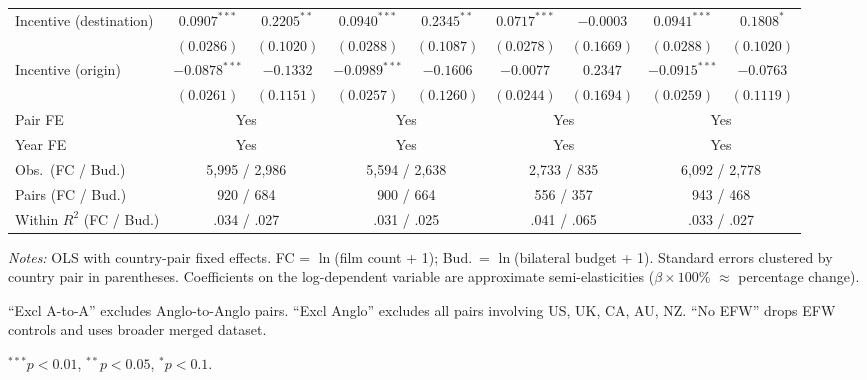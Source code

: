 \begin{table}[htbp]
\begin{tabular}{l cc cc cc cc }
Incentive (destination) & $0.0907^{***}$ & $0.2205^{**}$ & $0.0940^{***}$ & $0.2345^{**}$ & $0.0717^{***}$ & $-0.0003$ & $0.0941^{***}$ & $0.1808^{*}$ \\
 & $(0.0286)$ & $(0.1020)$ & $(0.0288)$ & $(0.1087)$ & $(0.0278)$ & $(0.1669)$ & $(0.0288)$ & $(0.1020)$ \\[4pt]
Incentive (origin) & $-0.0878^{***}$ & $-0.1332$ & $-0.0989^{***}$ & $-0.1606$ & $-0.0077$ & $0.2347$ & $-0.0915^{***}$ & $-0.0763$ \\
 & $(0.0261)$ & $(0.1151)$ & $(0.0257)$ & $(0.1260)$ & $(0.0244)$ & $(0.1694)$ & $(0.0259)$ & $(0.1119)$ \\[4pt]
\midrule
Pair FE & \multicolumn{2}{c}{Yes} & \multicolumn{2}{c}{Yes} & \multicolumn{2}{c}{Yes} & \multicolumn{2}{c}{Yes} \\
Year FE & \multicolumn{2}{c}{Yes} & \multicolumn{2}{c}{Yes} & \multicolumn{2}{c}{Yes} & \multicolumn{2}{c}{Yes} \\
Obs.\ (FC / Bud.) & \multicolumn{2}{c}{5,995 / 2,986} & \multicolumn{2}{c}{5,594 / 2,638} & \multicolumn{2}{c}{2,733 / 835} & \multicolumn{2}{c}{6,092 / 2,778} \\
Pairs (FC / Bud.) & \multicolumn{2}{c}{920 / 684} & \multicolumn{2}{c}{900 / 664} & \multicolumn{2}{c}{556 / 357} & \multicolumn{2}{c}{943 / 468} \\
Within $R^2$ (FC / Bud.) & \multicolumn{2}{c}{.034 / .027} & \multicolumn{2}{c}{.031 / .025} & \multicolumn{2}{c}{.041 / .065} & \multicolumn{2}{c}{.033 / .027} \\
\bottomrule
\end{tabular}
\par\vspace{4pt}\noindent\begin{minipage}{\textwidth}
\footnotesize
\par \textit{Notes:} OLS with country-pair fixed effects. FC = $\ln$(film count + 1); Bud.\ = $\ln$(bilateral budget + 1). Standard errors clustered by country pair in parentheses. Coefficients on the log-dependent variable are approximate semi-elasticities ($\beta \times 100\%$ $\approx$ percentage change).
\par ``Excl A-to-A'' excludes Anglo-to-Anglo pairs. ``Excl Anglo'' excludes all pairs involving US, UK, CA, AU, NZ. ``No EFW'' drops EFW controls and uses broader merged dataset.
\par $^{***}p<0.01$, $^{**}p<0.05$, $^{*}p<0.1$.
\end{minipage}
\end{table}

